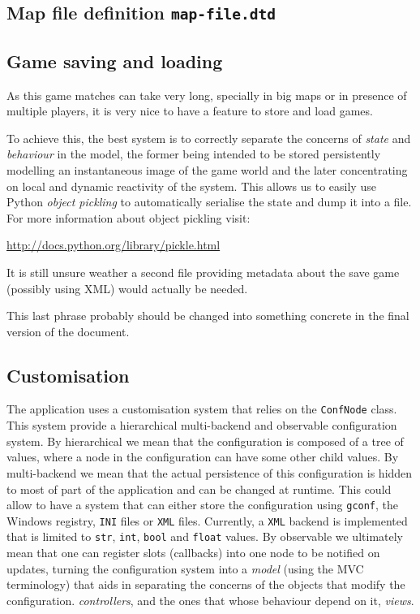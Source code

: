 \documentclass[12pt,a4paper]{article}
\begin{document}
\subsection{Map file definition \texttt{map-file.dtd}}



\subsection{Game saving and loading}

As this game matches can take very long, specially in big maps or in
presence of multiple players, it is very nice to have a feature to
store and load games.

To achieve this, the best system is to correctly separate the concerns
of \emph{state} and \emph{behaviour} in the model, the former being
intended to be stored persistently modelling an instantaneous image of
the game world and the later concentrating on local and dynamic
reactivity of the system. This allows us to easily use Python
\emph{object pickling} to automatically serialise the state and dump
it into a file. For more information about object pickling visit:

\url{http://docs.python.org/library/pickle.html}

It is still unsure weather a second file providing metadata about the
save game (possibly using XML) would actually be needed.

\begin{todo}
  This last phrase probably should be changed into something concrete in
  the final version of the document.
\end{todo}

\subsection{Customisation}

The application uses a customisation system that relies on the
\texttt{ConfNode} class. This system provide a hierarchical
multi-backend and observable configuration system. By hierarchical we
mean that the configuration is composed of a tree of values, where a
node in the configuration can have some other child values. By
multi-backend we mean that the actual persistence of this
configuration is hidden to most of part of the application and can be
changed at runtime. This could allow to have a system that can either
store the configuration using \texttt{gconf}, the Windows registry,
\texttt{INI} files or \texttt{XML} files. Currently, a \texttt{XML}
backend is implemented that is limited to \texttt{str}, \texttt{int},
\texttt{bool} and \texttt{float} values. By observable we ultimately
mean that one can register slots (callbacks) into one node to be
notified on updates, turning the configuration system into a
\emph{model} (using the MVC terminology) that aids in separating the
concerns of the objects that modify the configuration.
\emph{controllers}, and the ones that whose behaviour depend on it,
\emph{views}.
\end{document}
